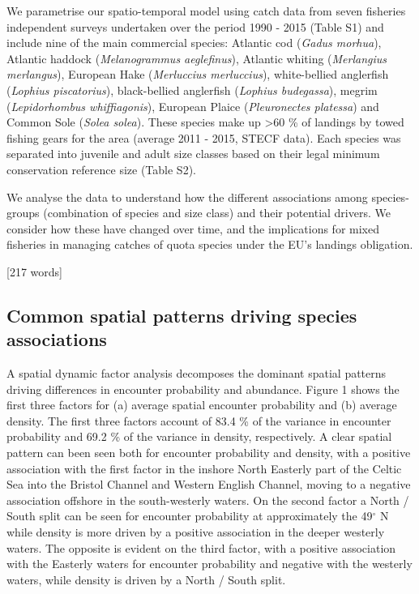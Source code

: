 \documentclass{nature}
\begin{document}
\begin{linenumbers}
We parametrise our spatio-temporal model using catch data from seven fisheries
independent surveys undertaken over the period 1990 - 2015 (Table S1) and
include nine of the main commercial species: Atlantic cod (\textit{Gadus
	morhua}), Atlantic haddock (\textit{Melanogrammus aeglefinus}),
Atlantic whiting (\textit{Merlangius merlangus}), European Hake
(\textit{Merluccius merluccius}), white-bellied anglerfish (\textit{Lophius
	piscatorius}), black-bellied anglerfish (\textit{Lophius budegassa}),
megrim (\textit{Lepidorhombus whiffiagonis}), European Plaice
(\textit{Pleuronectes platessa}) and Common Sole (\textit{Solea solea}). These
species make up \textgreater 60 \% of landings by towed fishing gears for the
area (average 2011 - 2015, STECF data). Each species was separated into
juvenile and adult size classes based on their legal minimum conservation
reference size (Table S2).

We analyse the data to understand how the different associations among
species-groups (combination of species and size class) and their potential
drivers. We consider how these have changed over time, and the implications for
mixed fisheries in managing catches of quota species under the EU's landings
obligation.

[217 words]

\subsection{Common spatial patterns driving species associations}
A spatial dynamic factor analysis decomposes the dominant spatial patterns
driving differences in encounter probability and abundance. Figure 1 shows the
first three factors for (a) average spatial encounter probability and (b)
average density. The first three factors account of 83.4 \% of the variance in
encounter probability and 69.2 \% of the variance in density, respectively. A
clear spatial pattern can been seen both for encounter probability and density,
with a positive association with the first factor in the inshore North Easterly
part of the Celtic Sea into the Bristol Channel and Western English Channel,
moving to a negative association offshore in the south-westerly waters. On the
second factor a North / South split can be seen for encounter probability at
approximately the 49$^{\circ}$ N while density is more driven by a positive
association in the deeper westerly waters.  The opposite is evident on the
third factor, with a positive association with the Easterly waters for
encounter probability and negative with the westerly waters, while density is
driven by a North / South split.


\end{linenumbers}
\end{document}
